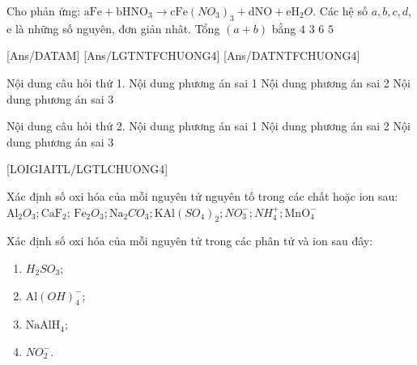\begin{ex}
	Cho phản ứng: $\mathrm{aFe}+\mathrm{bHNO}_3\to \mathrm{cFe}\left(NO_3\right)_3+\mathrm{dNO}+\mathrm{eH}_2O$. Các hệ số $a, b, c, d$, e là những số nguyên, đơn giản nhât. Tổng $(a+b)$ bằng
	\choice
	{$4$}
	{$3$}
	{$6$}
	{$5$}
	\loigiai{}
\end{ex}
[Ans/DATAM]
\luulgEXTF
{}[Ans/LGTNTFCHUONG4]
[Ans/DATNTFCHUONG4]
\begin{ex}[1]
	Nội dung câu hỏi thứ 1.
	{Nội dung phương án sai 1}
	{\True Nội dung phương án sai 2}
	{Nội dung phương án sai 3}
\end{ex}
\begin{ex}[1]
	Nội dung câu hỏi thứ 2.
	{Nội dung phương án sai 1}
	{ \True Nội dung phương án sai 2}
	{\True Nội dung phương án sai 3}
\end{ex}
[LOIGIAITL/LGTLCHUONG4]
\luuloigiaibt
\begin{bt}
	Xác định số oxi hóa của mỗi nguyên tử nguyên tố trong các chất hoặc ion sau: $\mathrm{Al}_2O_3; \mathrm{CaF}_2$; $\mathrm{Fe}_2O_3; \mathrm{Na}_2CO_3; \mathrm{KAl}\left(SO_4\right)_2; NO_3^{-}; NH_4^{+}; \mathrm{MnO}_4^{-}$
\end{bt}

\begin{bt}
	Xác định số oxi hóa của mỗi nguyên tử trong các phân tử và ion sau đây:
	\begin{enumerate}
		\item $H_2SO_3$;
		\item $\mathrm{Al}(OH)_4^{-}$;
		\item $\mathrm{NaAlH}_4$;
		\item $NO_2^{-}$.
	\end{enumerate}
\end{bt}

